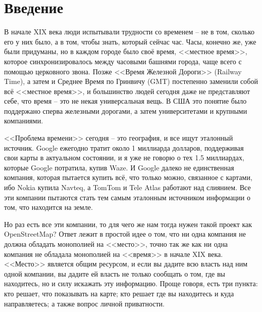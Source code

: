 \section{Введение}
В начале XIX века люди испытывали трудности со временем -- не в том, сколько 
его у них было, а в том, чтобы знать, который сейчас час. Часы, конечно же, 
уже были придуманы, но в каждом городе было своё время, <<местное время>>, 
которое синхронизировалось между часовыми башнями города, чаще всего с 
помощью церковного звона. Позже <<Время Железной Дороги>> (Railway Time), а 
затем и Среднее Время по Гринвичу (GMT) постепенно заменили собой всё 
<<местное время>>, и большинство людей сегодня даже не представляют себе, что 
время -- это не некая универсальная вещь. В США это понятие было поддержано 
сперва железными дорогами, а затем университетами и крупными компаниями.

<<Проблема времени>> сегодня -- это география, и все ищут эталонный источник. 
Google ежегодно тратит около 1 миллиарда долларов, поддерживая свои карты в 
актуальном состоянии, и я уже не говорю о тех 1.5 миллиардах, которые Google 
потратила, купив Waze\cite{waze}. И Google далеко не единственная компания, 
которая пытается купить всё, что только можно, связанное с картами, ибо 
Nokia купила Navteq\cite{navteq}, а TomTom\cite{tomtom} и 
Tele Atlas\cite{teleatlas} работают над слиянием. Все эти компании пытаются 
стать тем самым эталонным источником информации о том, что находится на земле.

Но раз есть все эти компании, то для чего же нам тогда нужен такой проект как 
OpenStreetMap? Ответ лежит в простой идее о том, что ни одна компания не 
должна обладать монополией на <<место>>, точно так же как ни одна компания не 
обладала монополией на <<время>> в начале XIX века. <<Место>> является общим 
ресурсом, и если вы дадите всю власть над ним одной компании, вы дадите ей 
власть не только сообщать о том, где вы находитесь, но и силу искажать эту 
информацию. Проще говоря, есть три пункта: кто решает, что показывать на 
карте; кто решает где вы находитесь и куда направляетесь; а также вопрос 
личной приватности.

